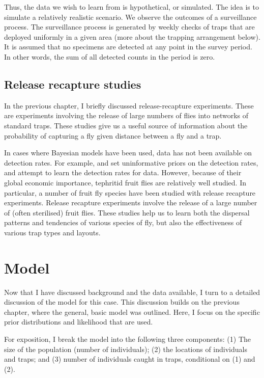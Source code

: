 \documentclass[
  oneside]{book}
\begin{document}
Thus, the data we wish to learn from is hypothetical, or simulated. The idea is to simulate a relatively realistic scenario. We observe the outcomes of a surveillance process. The surveillance process is generated by weekly checks of traps that are deployed uniformly in a given area (more about the trapping arrangement below). It is assumed that no specimens are detected at any point in the survey period. In other words, the sum of all detected counts in the period is zero.

\hypertarget{release-recapture-studies}{%
\subsection{Release recapture studies}\label{release-recapture-studies}}

In the previous chapter, I briefly discussed release-recapture experiments. These are experiments involving the release of large numbers of flies into networks of standard traps. These studies give us a useful source of information about the probability of capturing a fly given distance between a fly and a trap.

In cases where Bayesian models have been used, data has not been available on detection rates. For example, \citet{caley2014} and \citet{keith2013} set uninformative priors on the detection rates, and attempt to learn the detection rates for data. However, because of their global economic importance, tephritid fruit flies are relatively well studied. In particular, a number of fruit fly species have been studied with release recapture experiments. Release recapture experiments involve the release of a large number of (often sterilised) fruit flies. These studies help us to learn both the dispersal patterns and tendencies of various species of fly, but also the effectiveness of various trap types and layouts.

\hypertarget{model}{%
\section{Model}\label{model}}

Now that I have discussed background and the data available, I turn to a detailed discussion of the model for this case. This discussion builds on the previous chapter, where the general, basic model was outlined. Here, I focus on the specific prior distributions and likelihood that are used.

For exposition, I break the model into the following three components: (1) The size of the population (number of individuals); (2) the locations of individuals and traps; and (3) number of individuals caught in traps, conditional on (1) and (2).
\end{document}
